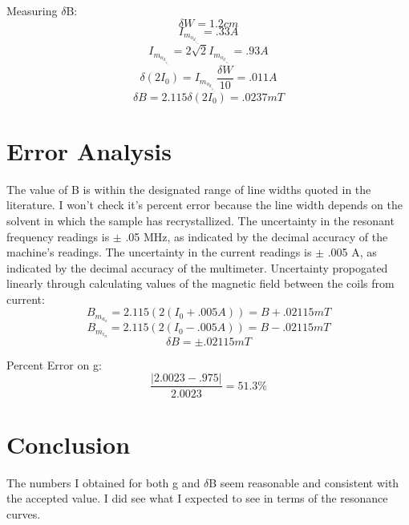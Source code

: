 \documentclass[12pt]{article}
\begin{document}
Measuring $\delta$B:
\[\delta W = 1.2 cm\]
\[I_m_o_d_,_r_m_s = .33 A \]
\[I_m_o_d_,_p_-_p = 2\sqrt{2} I_m_o_d_,_r_m_s = .93 A \]
\[\delta (2I_0) = I_m_o_d_,_p_-_p \frac{\delta W}{10} = .011 A\]
\[\delta B = 2.115 \delta (2I_0) = .0237 mT \]

\section{Error Analysis}
\indent \indent The value of \delta B is within the designated range of line widths quoted in the literature. I won't check it's percent error because the line width depends on the solvent in which the sample has recrystallized. The uncertainty in the resonant frequency readings is $\pm$ .05 MHz, as indicated by the decimal accuracy of the machine's readings. The uncertainty in the current readings is $\pm$ .005 A, as indicated by the decimal accuracy of the multimeter. Uncertainty propogated linearly through calculating values of the magnetic field between the coils from current:
\[B_m_a_x = 2.115(2(I_0 + .005 A)) = B + .02115 mT \]
\[B_m_i_n = 2.115(2(I_0 - .005 A)) = B - .02115 mT \]
\[\delta B = \pm .02115 mT \]

\indent Percent Error on g:
\[\frac{|2.0023 - .975|}{2.0023} = 51.3 \% \]

\section{Conclusion}
\indent \indent The numbers I obtained for both g and $\delta$B seem reasonable and consistent with the accepted value. I did see what I expected to see in terms of the resonance curves.
\end{document}
